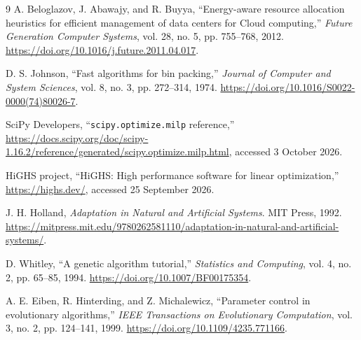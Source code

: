\documentclass[10pt,a4paper]{article}
\begin{document}
\clearpage
\begin{thebibliography}{9}
\small
{}
A. Beloglazov, J. Abawajy, and R. Buyya, ``Energy-aware resource allocation
heuristics for efficient management of data centers for Cloud computing,''
\emph{Future Generation Computer Systems}, vol. 28, no. 5, pp. 755--768, 2012.
\url{https://doi.org/10.1016/j.future.2011.04.017}.

D. S. Johnson, ``Fast algorithms for bin packing,''
\emph{Journal of Computer and System Sciences}, vol. 8, no. 3, pp. 272--314,
1974. \url{https://doi.org/10.1016/S0022-0000(74)80026-7}.

SciPy Developers, ``\texttt{scipy.optimize.milp} reference,''
\url{https://docs.scipy.org/doc/scipy-1.16.2/reference/generated/scipy.optimize.milp.html},
accessed 3 October 2026.

HiGHS project, ``HiGHS: High performance software for linear optimization,''
\url{https://highs.dev/}, accessed 25 September 2026.

J. H. Holland, \emph{Adaptation in Natural and Artificial Systems}.
MIT Press, 1992.
\url{https://mitpress.mit.edu/9780262581110/adaptation-in-natural-and-artificial-systems/}.

D. Whitley, ``A genetic algorithm tutorial,'' \emph{Statistics and Computing},
vol. 4, no. 2, pp. 65--85, 1994.
\url{https://doi.org/10.1007/BF00175354}.

A. E. Eiben, R. Hinterding, and Z. Michalewicz,
``Parameter control in evolutionary algorithms,''
\emph{IEEE Transactions on Evolutionary Computation},
vol. 3, no. 2, pp. 124--141, 1999.
\url{https://doi.org/10.1109/4235.771166}.

\end{thebibliography}
\end{document}
